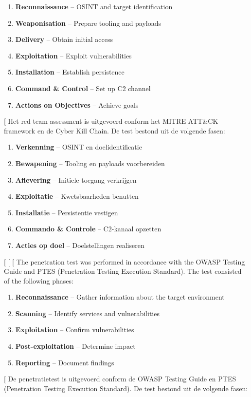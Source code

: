 {{{{\begin{enumerate}
  \item \textbf{Reconnaissance} -- OSINT and target identification
  \item \textbf{Weaponisation} -- Prepare tooling and payloads
  \item \textbf{Delivery} -- Obtain initial access
  \item \textbf{Exploitation} -- Exploit vulnerabilities
  \item \textbf{Installation} -- Establish persistence
  \item \textbf{Command \& Control} -- Set up C2 channel
  \item \textbf{Actions on Objectives} -- Achieve goals
\end{enumerate}
[%
Het red team assessment is uitgevoerd conform het MITRE ATT\&CK framework en de Cyber Kill Chain.
De test bestond uit de volgende fasen:

\begin{enumerate}
  \item \textbf{Verkenning} -- OSINT en doelidentificatie
  \item \textbf{Bewapening} -- Tooling en payloads voorbereiden
  \item \textbf{Aflevering} -- Initiele toegang verkrijgen
  \item \textbf{Exploitatie} -- Kwetsbaarheden benutten
  \item \textbf{Installatie} -- Persistentie vestigen
  \item \textbf{Commando \& Controle} -- C2-kanaal opzetten
  \item \textbf{Acties op doel} -- Doelstellingen realiseren
\end{enumerate}
[%
[%
[%
The penetration test was performed in accordance with the OWASP Testing Guide and PTES (Penetration Testing
Execution Standard). The test consisted of the following phases:

\begin{enumerate}
  \item \textbf{Reconnaissance} -- Gather information about the target environment
  \item \textbf{Scanning} -- Identify services and vulnerabilities
  \item \textbf{Exploitation} -- Confirm vulnerabilities
  \item \textbf{Post-exploitation} -- Determine impact
  \item \textbf{Reporting} -- Document findings
\end{enumerate}
[%
De penetratietest is uitgevoerd conform de OWASP Testing Guide en PTES (Penetration Testing
Execution Standard). De test bestond uit de volgende fasen:

}}}}
